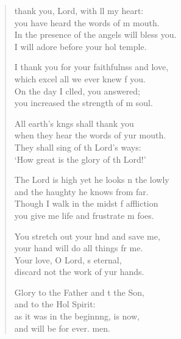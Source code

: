 \settowidth{\versewidth}{In the presence of the angels I will bless you. *}
\begin{verse}%
  \begin{patverse}
 thank you, Lord, with ll my heart:\Med\\
you have heard the words of m mouth.\\
In the presence of the angels  will bless you.\Med\\
I will adore before your hol temple.

I thank you for your faithfulnss and love,\Med\\
which excel all we ever knew f you.\\
On the day I clled, you answered;\Med\\
you increased the strength of m soul.

All earth’s k\pointup{\i}ngs shall thank you\Med\\
when they hear the words of yur mouth.\\
They shall sing of th Lord’s ways:\Med\\
‘How great is the glory of th Lord!’

The Lord is high yet he looks n the lowly\Med\\
and the haughty he knows from far.\\
Though I walk in the midst f affliction\Med\\
you give me life and frustrate m foes.

You stretch out your hnd and save me,\Med\\
your hand will do all things fr me.\\
Your love, O Lord, \pointup{\i}s eternal,\Med\\
discard not the work of yur hands.

Glory to the Father and t the Son,\Med\\
and to the Hol Spirit:\\
as it was in the beginn\pointup{\i}ng, is now,\Med\\
and will be for ever. men.
  \end{patverse}
\end{verse}
